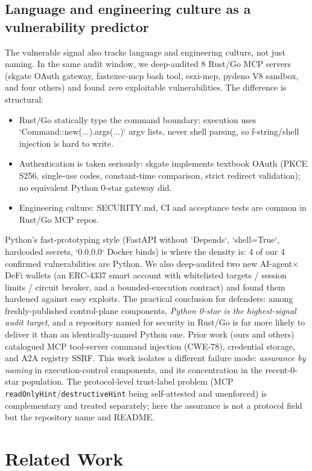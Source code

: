 \documentclass{llncs}
\begin{document}
\subsection{Language and engineering culture as a vulnerability predictor}\label{sub:lang}
The vulnerable signal also tracks language and engineering culture, not just naming. In the same audit window, we deep-audited 8 Rust/Go MCP servers (skgate OAuth gateway, fastexec-mcp bash tool, esxi-mcp, pydeno V8 sandbox, and four others) and found \emph{zero} exploitable vulnerabilities. The difference is structural:
\begin{itemize}
\item Rust/Go statically type the command boundary: execution uses `Command::new(...).args(...)` argv lists, never shell parsing, so f-string/shell injection is hard to write.
\item Authentication is taken seriously: skgate implements textbook OAuth (PKCE S256, single-use codes, constant-time comparison, strict redirect validation); no equivalent Python 0-star gateway did.
\item Engineering culture: SECURITY.md, CI and acceptance tests are common in Rust/Go MCP repos.
\end{itemize}
Python's fast-prototyping style (FastAPI without `Depends`, `shell=True`, hardcoded secrets, `0.0.0.0` Docker binds) is where the density is: 4 of our 4 confirmed vulnerabilities are Python. We also deep-audited two new AI-agent$\times$DeFi wallets (an ERC-4337 smart account with whitelisted targets / session limits / circuit breaker, and a bounded-execution contract) and found them hardened against easy exploits. The practical conclusion for defenders: among freshly-published control-plane components, \emph{Python 0-star is the highest-signal audit target}, and a repository named for security in Rust/Go is far more likely to deliver it than an identically-named Python one.
Prior work (ours and others) catalogued MCP tool-server command injection (CWE-78), credential storage, and A2A registry SSRF. This work isolates a different failure mode: \emph{assurance by naming} in execution-control components, and its concentration in the recent-0-star population. The protocol-level trust-label problem (MCP \texttt{readOnlyHint}/\texttt{destructiveHint} being self-attested and unenforced) is complementary and treated separately; here the assurance is not a protocol field but the repository name and README.

\section{Related Work}\label{sec:related}
\end{document}
